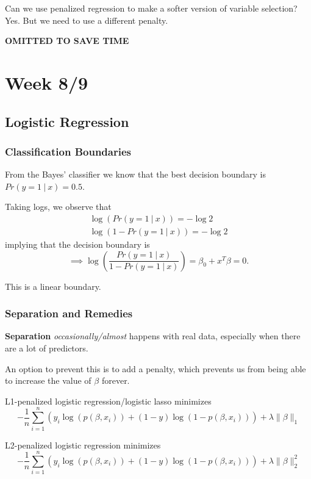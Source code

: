\documentclass[11pt]{article}
\theoremstyle{definition}
\numberwithin{equation}{section}
\begin{document}
\begin{writenotes}
  Can we use penalized regression to make a softer version of variable selection? Yes. But we need to use a different penalty.
\end{writenotes}

\textbf{OMITTED TO SAVE TIME}

\section{Week 8/9}
\subsection{Logistic Regression}
\subsubsection{Classification Boundaries}

 From the Bayes' classifier we know that the best decision boundary is $Pr(y=1\>|\>x)=0.5$.

 Taking logs, we observe that
 \begin{gather}
   \log(Pr(y=1\>|\> x))= -\log 2\\
   \log(1 - Pr(y=1\>|\> x))= -\log 2
 \end{gather}
 implying that the decision boundary is
 \begin{equation}
   \implies\log\left( \frac{Pr(y=1\>|\> x)}{1 - Pr(y=1\>|\> x)} \right)=\beta_0+x^T\beta=0.
 \end{equation}
\begin{writenotes}
  This is a linear boundary.
\end{writenotes}

\subsubsection{Separation and Remedies}

\textbf{Separation} \textit{occasionally/almost} happens with real data, especially when there are a lot of predictors.

An option to prevent this is to add a penalty, which prevents us from being able to increase the value of $\beta$ forever.

\begin{indent}
  L1-penalized logistic regression/logistic lasso minimizes
  \begin{equation}
  -\frac{1}{n}\sum^n_{i=1}(y_i\log(p(\beta,x_i)) + (1-y)\log(1-p(\beta, x_i))) + \lambda\| \beta \|_1
  \end{equation}

  L2-penalized logistic regression minimizes
  \begin{equation}
  -\frac{1}{n}\sum^n_{i=1}(y_i\log(p(\beta,x_i)) + (1-y)\log(1-p(\beta, x_i))) + \lambda\| \beta \|^2_2
  \end{equation}
\end{indent}
\end{document}

